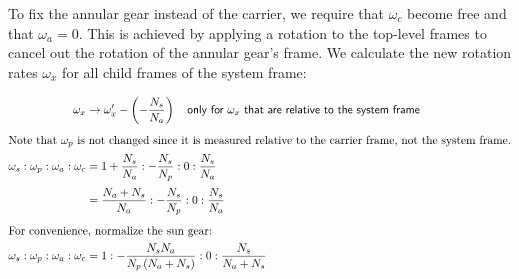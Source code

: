 \documentclass[12pt]{article}
\begin{document}
To fix the annular gear instead of the carrier, we require that $\omega_c$ become free and that $\omega_a = 0$.  This is achieved by applying a rotation to the top-level frames to cancel out the rotation of the annular gear's frame.  We calculate the new rotation rates $\omega_x$ for all child frames of the system frame:

\def\wa{\frac{N_s}{N_a}}

\begin{align*}
	\omega_x &\rightarrow \omega^\prime_x - \left(-\frac{N_s}{N_a}\right)
		\textsf{\quad only for $\omega_x$ that are relative to the system frame}\\[1ex]
	\intertext{Note that $\omega_p$ is not changed since it is measured relative to the carrier frame, not the system frame.}
	\omega_s : \omega_p : \omega_a : \omega_c
		&= 1+\wa : -\frac{N_s}{N_p} : 0 : \wa\\[0.5ex]
		&= \frac{N_a+N_s}{N_a} : -\frac{N_s}{N_p} : 0 : \wa\\[1ex]
	\intertext{For convenience, normalize the sun gear:}
	\omega_s : \omega_p : \omega_a : \omega_c
		&= 1 : -\frac{N_sN_a}{N_p\left(N_a+N_s\right)} : 0 : \frac{N_s}{N_a+N_s}
\end{align*}
\end{document}
